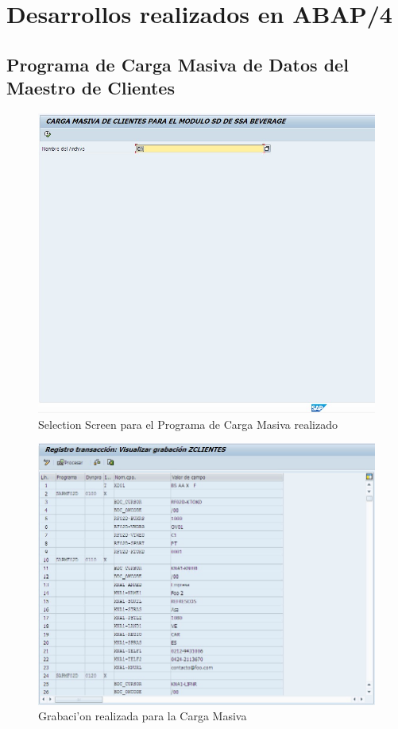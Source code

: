 \chapter{Desarrollos realizados en ABAP/4}

\section{Programa de Carga Masiva de Datos del Maestro de Clientes}
\begin{figure}[H]
\centering
\includegraphics[scale=0.65,type=jpg,ext=.jpg,read=.jpg]{figures/screen}
\caption{Selection Screen para el Programa de Carga Masiva realizado}
\label{fig:screen}
\end{figure}

\begin{figure}[H]
\centering
\includegraphics[scale=0.65,type=jpg,ext=.jpg,read=.jpg]{figures/sm35}
\caption{Grabaci'on realizada para la Carga Masiva}
\label{fig:sm35}
\end{figure}

